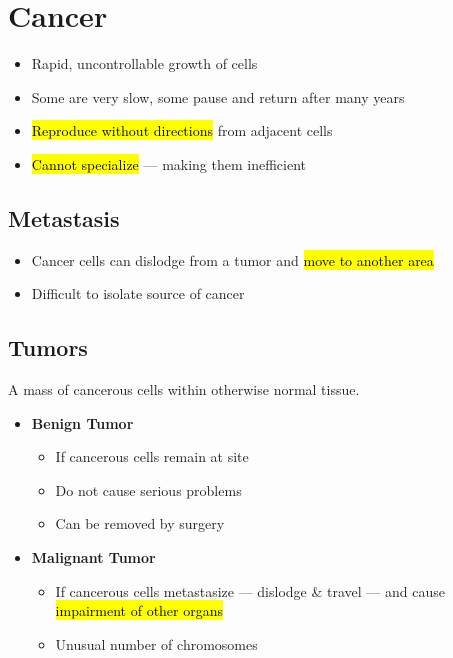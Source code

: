 \documentclass[a4paper,12pt]{article}
\begin{document}
\pagebreak

\section{Cancer}
\begin{itemize}
    \item{Rapid, uncontrollable growth of cells}
    \item{Some are very slow, some pause and return after many years}
    \item{\hl{Reproduce without directions} from adjacent cells}
    \item{\hl{Cannot specialize} --- making them inefficient}
\end{itemize}

\subsection{Metastasis}
\begin{itemize}
    \item{Cancer cells can dislodge from a tumor and \hl{move to another area}}
    \item{Difficult to isolate source of cancer}
\end{itemize}

\subsection{Tumors}\noindent

A mass of cancerous cells within otherwise normal tissue.

\begin{itemize}
    \item{
            \textbf{Benign Tumor}

            \begin{itemize}
                \item{If cancerous cells remain at site}
                \item{Do not cause serious problems}
                \item{Can be removed by surgery}
            \end{itemize}
        }
    \item{
            \textbf{Malignant Tumor}

            \begin{itemize}
                \item{If cancerous cells metastasize --- dislodge \& travel --- and cause \hl{impairment of other organs}}
                \item{Unusual number of chromosomes}
            \end{itemize}
        }
\end{itemize}
\end{document}
